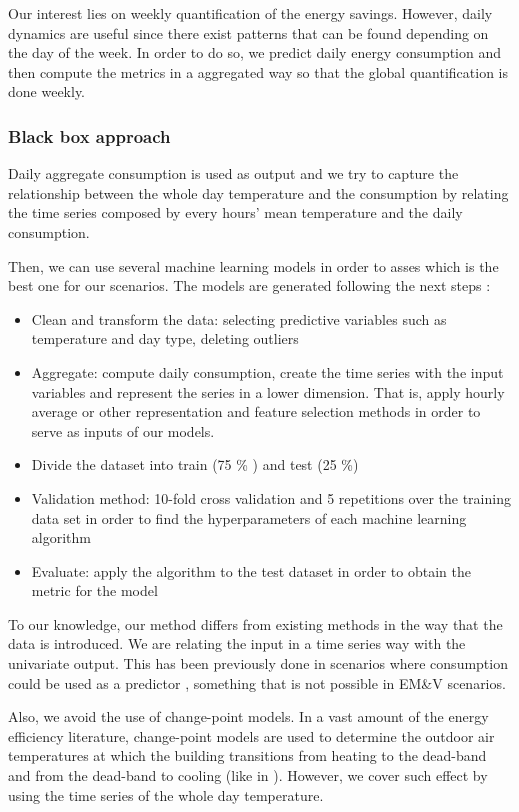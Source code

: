 \documentclass[10pt, conference, compsocconf]{IEEEtran}
\begin{document}
Our interest lies on weekly quantification of the energy savings. However, daily dynamics are useful since there exist patterns that can be found depending on the day of the week. In order to do so, we  predict daily energy consumption and then compute the metrics in a aggregated way so that the global quantification is done weekly.

\subsubsection{Black box approach}

Daily aggregate consumption is used as output and we try to capture the relationship between the whole day temperature and the consumption by relating the time series composed by every hours' mean temperature and the daily consumption.

Then, we can use several machine learning models in order to asses which is the best one for our scenarios. The models are generated  following the next steps \cite{gonzalez2016towards}:

\begin{itemize}
\item Clean and transform the data: selecting predictive variables such as temperature and day type, deleting outliers 
\item Aggregate: compute daily consumption, create the time series with the input variables and represent the series in a lower dimension. That is, apply hourly average or other representation and feature selection methods in order to serve as inputs of our models.
\item Divide the dataset into train (75 \% ) and test (25 \%)
\item Validation method: 10-fold cross validation and 5 repetitions over the training data set in order to find the hyperparameters of each machine learning algorithm
\item Evaluate: apply the algorithm to the test dataset in order to obtain the metric for the model
\end{itemize}


To our knowledge, our method differs from existing methods in the way that the data is introduced. We are relating the input in a time series way with the univariate output. This has been previously done in scenarios where consumption could be used as a predictor \cite{ruijin2013building}, something that is not possible in EM\&V scenarios.

Also, we avoid the use of change-point models. In a vast amount of the energy efficiency literature, change-point models are used to determine the outdoor air temperatures at which the building transitions from heating to the dead-band and from the dead-band to cooling (like in \cite{kissock1998ambient}). However, we cover such effect by using the time series of the whole day temperature. 
\end{document}
